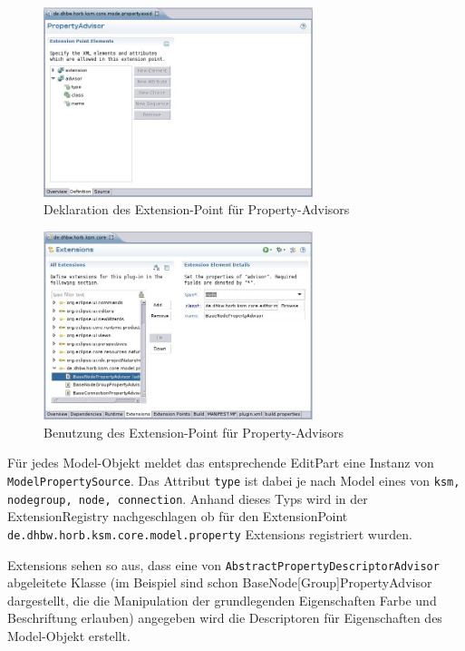\documentclass[%
12pt,titlepage,abstracton,DIV=10,BCOR=0.5cm]{scrreprt}
\begin{document}
\begin{figure}[ht]
\centering
\includegraphics[width=0.7\textwidth]{images/eclipse-property-declaration-extensionpoint.jpg}
\caption{Deklaration des Extension-Point für Property-Advisors}
\label{fig:property-declaration-extensionpoint}
\end{figure}

\begin{figure}[ht!]
\centering
\includegraphics[width=0.7\textwidth]{images/eclipse-property-usage-extensionpoint.jpg}
\caption{Benutzung des Extension-Point für Property-Advisors}
\label{fig:eclipse-property-usage-extensionpoint}
\end{figure}

Für jedes Model-Objekt meldet das entsprechende EditPart eine Instanz von
\texttt{Model\-Property\-Source}. Das Attribut \texttt{type} ist dabei je nach
Model eines von \texttt{ksm, node\-group, node, con\-nection}.
Anhand dieses Typs wird in der Extension\-Registry nachgeschlagen ob für den
Extension\-Point \texttt{de.\-dhbw.\-horb.\-ksm.\-core.\-model.\-property}
Extensions registriert wurden.

Extensions sehen so aus, dass eine von
\texttt{Abstract\-Property\-Descriptor\-Advisor} abgeleitete Klasse (im
Beispiel sind schon BaseNode[Group]PropertyAdvisor dargestellt, die die
Manipulation der grundlegenden Eigenschaften Farbe und Beschriftung erlauben)
angegeben wird die Descriptoren für Eigenschaften des Model-Objekt erstellt.
\end{document}
